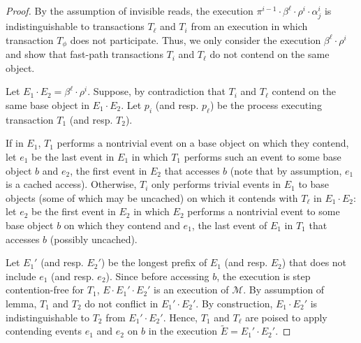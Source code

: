 \begin{proof}
%
By the assumption of invisible reads,
the execution $\pi^{i-1}\cdot \beta^{\ell}\cdot \rho^i \cdot \alpha_j^i$
is indistinguishable to
transactions $T_{\ell}$ and $T_{i}$
from an execution in which transaction $T_{\phi}$ does not participate.
Thus, we only consider the execution $\beta^{\ell}\cdot \rho^i$ and show that fast-path transactions $T_i$ and $T_{\ell}$ do not contend on the same object.                                                                                                                                                                                                    

Let $E_1\cdot E_2=\beta^{\ell}\cdot \rho^i$. 
Suppose, by contradiction that $T_i$ and $T_{\ell}$ 
contend on the same base object in $E_1\cdot E_2$.
Let $p_i$ (and resp. $p_{\ell}$) be the process executing transaction $T_1$ (and resp. $T_2$).

If in $E_1$, $T_1$ performs a nontrivial event on a base object on which they contend, let $e_1$ be the last
event in $E_1$ in which $T_1$ performs such an event to some base object $b$ and $e_2$, the first event
in $E_2$ that accesses $b$ (note that by assumption, $e_1$ is a cached access).
Otherwise, $T_i$ only performs trivial events in $E_1$ to base objects (some of which may be uncached) on which it contends with $T_{\ell}$ in $E_1\cdot E_2$:
let $e_2$ be the first event in $E_2$ in which $E_2$ performs a nontrivial event to some base object $b$
on which they contend and $e_1$, the last event of $E_1$ in $T_1$ that accesses $b$ (possibly uncached).

Let $E_1'$ (and resp. $E_2'$) be the longest prefix of $E_1$ (and resp. $E_2$) that does not include
$e_1$ (and resp. $e_2$).
Since before accessing $b$, the execution is step contention-free for $T_1$, $E \cdot
E_1'\cdot E_2'$ is an execution of $\mathcal{M}$.
By assumption of lemma, $T_1$ and $T_2$ do not conflict in $E_1'\cdot E_2'$.
By construction, $E_1 \cdot E_2'$ is indistinguishable to $T_2$ from $E_1' \cdot E_2'$.
Hence, $T_1$ and $T_{\ell}$ are poised to apply contending events $e_1$ and $e_2$ on $b$ in the execution
$\tilde E=E_1' \cdot E_2'$.


\end{proof}
